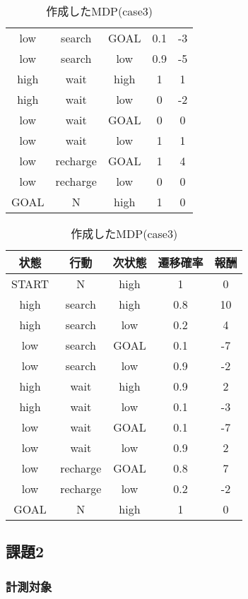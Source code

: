 \begin{table}[hbtp]
\begin{minipage}[t]{0.45\hsize}
\begin{tabular}{|c|c|c|c|c|}
        \hline
        low & search & GOAL & 0.1 & -3 \\
        low & search & low & 0.9 & -5 \\
        \hline
        high & wait & high & 1 & 1 \\
        high & wait & low & 0 & -2 \\
        \hline
        low & wait & GOAL & 0 & 0 \\
        low & wait & low & 1 & 1 \\
        \hline
        low & recharge & GOAL & 1 & 4 \\
        low & recharge & low & 0 & 0 \\
        \hline
        GOAL & N & high & 1 & 0 \\
        \hline
      \end{tabular}
    \end{minipage}
    \begin{minipage}[t]{0.45\hsize}
      \centering
      \caption{作成したMDP(case3)}
      \label{table:3}
        \begin{tabular}{|c|c|c|c|c|}
          \hline
          状態 & 行動 & 次状態 & 遷移確率 & 報酬\\
          \hline
          \hline
          START & N & high & 1 & 0 \\
          \hline
          high & search & high & 0.8 & 10 \\
          high & search & low & 0.2 & 4 \\
          \hline
          low & search & GOAL & 0.1 & -7 \\
          low & search & low & 0.9 & -2 \\
          \hline
          high & wait & high & 0.9 & 2 \\
          high & wait & low & 0.1 & -3 \\
          \hline
          low & wait & GOAL & 0.1 & -7 \\
          low & wait & low & 0.9 & 2 \\
          \hline
          low & recharge & GOAL & 0.8 & 7 \\
          low & recharge & low & 0.2 & -2 \\
          \hline
          GOAL & N & high & 1 & 0 \\
          \hline
        \end{tabular}
      \end{minipage}
\end{table}


\subsection{課題2}
\subsubsection{計測対象}
